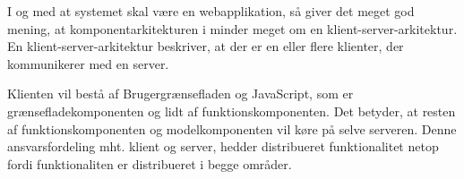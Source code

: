 I og med at systemet skal være en webapplikation, så giver det meget god mening, at komponentarkitekturen i  minder meget om en klient-server-arkitektur. En klient-server-arkitektur beskriver, at der er en eller flere klienter, der kommunikerer med en server. 

Klienten vil bestå af Brugergrænsefladen og JavaScript, som er grænsefladekomponenten og lidt af funktionskomponenten. Det betyder, at resten af funktionskomponenten og modelkomponenten vil køre på selve serveren. Denne ansvarsfordeling mht. klient og server, hedder distribueret funktionalitet netop fordi funktionaliten er distribueret i begge områder.